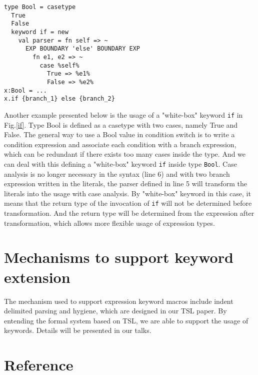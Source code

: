 \documentclass[letterpaper, notitlepage]{article}
\begin{document}
\begin{figure*}[htb!]
\begin{center}
\begin{lstlisting}[style=wyvern]
type Bool = casetype
  True
  False
  keyword if = new
    val parser = fn self => ~
      EXP BOUNDARY 'else' BOUNDARY EXP
        fn e1, e2 => ~
          case %self%
            True => %e1%
            False => %e2%
x:Bool = ...
x.if {branch_1} else {branch_2}
\end{lstlisting}
\end{center}
\caption{``White-box'' keyword \texttt{if} defined as a member of  type \texttt{Bool}}
\label{if}
\end{figure*}
\par

Another example presented below is the usage of a "white-box" keyword \texttt{if} in Fig.\ref{if}. Type Bool is defined as a casetype with two cases, namely True and False. The general way to use a Bool value in condition switch is to write a condition expression and associate each condition with a branch expression, which can be redundant if there exists too many cases inside the type. And we can deal with this defining a "white-box" keyword \texttt{if} inside type \texttt{Bool}. Case analysis is no longer necessary in the syntax (line 6) and with two branch expression written in the literals, the parser defined in line 5 will transform the literals into the usage with case analysis. By "white-box" keyword in this case, it means that the return type of the invocation of \texttt{if} will not be determined before transformation. And the return type will be determined from the expression after transformation, which allows more flexible usage of expression types.

\section{Mechanisms to support keyword extension}
The mechanism used to support expression keyword macros include indent delimited parsing and hygiene, which are designed in our TSL paper. By entending the formal system based on TSL, we are able to support the usage of keywords. Details will be presented in our talks.

\section{Reference}
\end{document}

